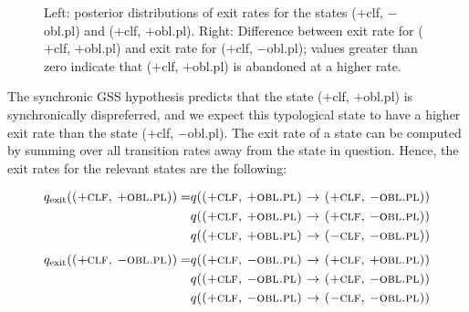 \documentclass[11pt]{article}
\begin{document}
\begin{figure}[h!]
\begin{minipage}[t]{.45\linewidth}
\end{minipage}
\caption{Left: posterior distributions of exit rates for the states {\sc ($+$clf, $-$obl.pl)} and {\sc ($+$clf, $+$obl.pl)}. Right: Difference between exit rate for {\sc ($+$clf, $+$obl.pl)} and exit rate for {\sc ($+$clf, $-$obl.pl)}; values greater than zero indicate that {\sc ($+$clf, $+$obl.pl)} is abandoned at a higher rate.} 
\label{syn_rates}
\end{figure}

The synchronic GSS hypothesis predicts that the state {\sc ($+$clf, $+$obl.pl)} is synchronically dispreferred, and we expect this typological state to have a higher exit rate than the state {\sc ($+$clf, $-$obl.pl)}. 
The exit rate of a state can be computed by summing over all transition rates away from the state in question. Hence, the exit rates for the relevant states are the following:

\begin{align*}
q_{\text{exit}}(\text{{\sc ($+$clf, $+$obl.pl)}}) = & q(\text{\sc ($+$clf, $+$obl.pl) $\rightarrow$ ($+$clf, $-$obl.pl)})\\
& q(\text{\sc ($+$clf, $+$obl.pl) $\rightarrow$ ($+$clf, $-$obl.pl)})\\
& q(\text{\sc ($+$clf, $+$obl.pl) $\rightarrow$ ($-$clf, $-$obl.pl)})\\
\end{align*}
\begin{align*}
q_{\text{exit}}(\text{{\sc ($+$clf, $-$obl.pl)}}) = & q(\text{\sc ($+$clf, $-$obl.pl) $\rightarrow$ ($+$clf, $+$obl.pl)})\\
& q(\text{\sc ($+$clf, $-$obl.pl) $\rightarrow$ ($+$clf, $-$obl.pl)})\\
& q(\text{\sc ($+$clf, $-$obl.pl) $\rightarrow$ ($-$clf, $-$obl.pl)})\\
\end{align*}
\end{document}
